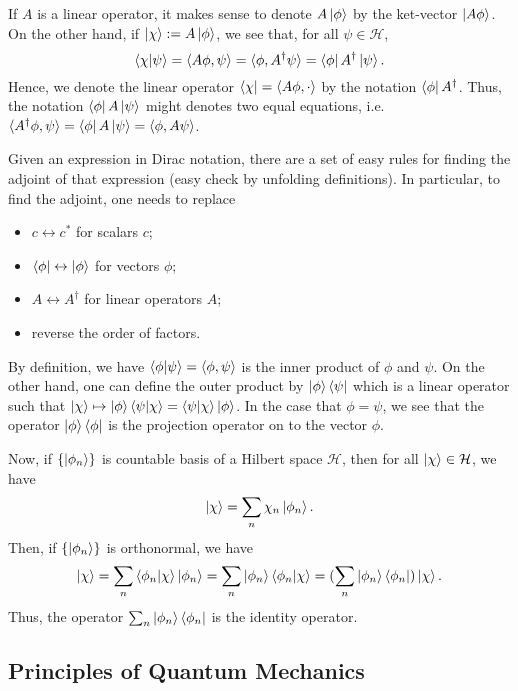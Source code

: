 \documentclass[]{article}
\theoremstyle{definition}
\theoremstyle{definition}
\begin{document}
If \(A\) is a linear operator, it makes sense to denote \(A \ket{\phi}\) by 
the ket-vector \(\ket{A \phi}\). On the other hand, if 
\(\ket{\chi} := A \ket{\phi}\), we see that, for all \(\psi \in \mathcal{H}\),
\[\bra{\chi} \ket{\psi} = \langle A \phi, \psi\rangle = 
  \langle \phi, A^\dagger \psi \rangle = \bra{\phi} A^\dagger \ket{\psi}.\]
Hence, we denote the linear operator \(\bra{\chi} = \langle A\phi, \cdot\rangle\) 
by the notation \(\bra{\phi} A^\dagger\). Thus, the notation \(\bra{\phi} A \ket{\psi}\)
might denotes two equal equations, i.e. 
\(\langle A^\dagger \phi, \psi \rangle = \bra{\phi} A \ket{\psi} = 
\langle \phi, A \psi \rangle\).

Given an expression in Dirac notation, there are a set of easy rules for finding 
the adjoint of that expression (easy check by unfolding definitions). In particular,
to find the adjoint, one needs to replace
\begin{itemize}
  \item \(c \leftrightarrow c^*\) for scalars \(c\);
  \item \(\bra{\phi} \leftrightarrow \ket{\phi}\) for vectors \(\phi\);
  \item \(A \leftrightarrow A^\dagger\) for linear operators \(A\);
  \item reverse the order of factors.
\end{itemize}

By definition, we have \(\bra{\phi}\ket{\psi} = \langle \phi, \psi \rangle\) 
is the inner product of \(\phi\) and \(\psi\). On the other hand, one can define 
the outer product by \(\ket{\phi} \bra{\psi}\) which is a linear operator such 
that \(\ket{\chi} \mapsto \ket{\phi}\bra{\psi}\ket{\chi} = \bra{\psi}\ket{\chi}\ket{\phi}\). 
In the case that \(\phi = \psi\), we see that the operator \(\ket{\phi} \bra{\phi}\) 
is the projection operator on to the vector \(\phi\).

Now, if \(\{\ket{\phi_n}\}\) is countable basis of a Hilbert space \(\mathcal{H}\), 
then for all \(\ket{\chi} \in \mathcal{H}\), we have 
\[\ket{\chi} = \sum_n \chi_n \ket{\phi_n}.\]
Then, if \(\{\ket{\phi_n}\}\) is orthonormal, we have 
\[\ket{\chi} = \sum_n \bra{\phi_n}\ket{\chi} \ket{\phi_n} = 
  \sum_n \ket{\phi_n} \bra{\phi_n} \ket{\chi} = 
  (\sum_n \ket{\phi_n} \bra{\phi_n}) \ket{\chi}.\]
Thus, the operator \(\sum_n \ket{\phi_n} \bra{\phi_n}\) is the identity operator.

\subsection{Principles of Quantum Mechanics}
\end{document}
